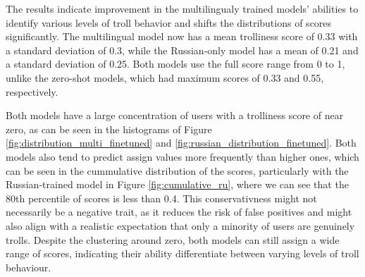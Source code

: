 \documentclass[twoside]{ctuthesis}
\theoremstyle{plain}
\theoremstyle{definition}
\theoremstyle{note}
\begin{document}
The results indicate improvement in the multilingualy trained models' abilities to identify various levels of troll behavior and shifts the distributions of scores significantly. The multilingual model now has a mean trolliness score of 0.33 with a standard deviation of 0.3, while the Russian-only model has a mean of 0.21 and a standard deviation of 0.25. Both models use the full score range from 0 to 1, unlike the zero-shot models, which had maximum scores of 0.33 and 0.55, respectively.\par

Both models have a large concentration of users with a trolliness score of near zero, as can be seen in the histograms of Figure \ref{fig:distribution_multi_finetuned} and \ref{fig:russian_distribution_finetuned}. Both models also tend to predict assign values more frequently than higher ones, which can be seen in the cummulative distribution of the scores, particularly with the Russian-trained model in Figure \ref{fig:cumulative_ru}, where we can see that the 80th percentile of scores is less than 0.4. This conservativness might not necessarily be a negative trait, as it reduces the risk of false positives and might also align with a realistic expectation that only a minority of users are genuinely trolls. Despite the clustering around zero, both models can still assign a wide range of scores, indicating their ability differentiate between varying levels of troll behaviour.\par
\end{document}
